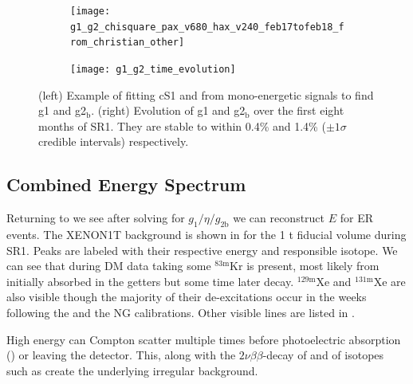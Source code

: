 \begin{figure}
    \begin{subfigure}[t]{0.4\textwidth}
        \texttt{[image: g1\_g2\_chisquare\_pax\_v680\_hax\_v240\_feb17tofeb18\_from\_christian\_other]}
    \end{subfigure}%
    \begin{subfigure}[t]{0.65\textwidth}
        \texttt{[image: g1\_g2\_time\_evolution]}
    \end{subfigure}
    \caption{(left) Example of fitting cS1 and \cstwob from mono-energetic signals to find g1 and g2$_{\mathrm{b}}$.  (right) Evolution
    of g1 and g2$_{\mathrm{b}}$ over the first eight months of SR1.  They are stable to within 0.4\% and 1.4\% ($\pm 1 \sigma$ credible
    intervals) respectively.}
	\label{fig:calibrations_photon_charge_efficiences_g1_g2}
\end{figure}



\subsection{Combined Energy Spectrum}
\label{subsec:det_char_ces}
Returning to  we see after solving for $g_1/\eta/g_{2 \mathrm{b}}$ we can reconstruct $E$ for ER
events.  The XENON1T
background is shown in  for the 1 t fiducial volume during SR1.  Peaks are
labeled with their respective energy and responsible isotope.  We can see that during DM data taking some $\mathrm{^{83m}Kr}$ is present,
most
likely from  initially absorbed in the getters but some time later decay.  $\mathrm{^{129m}Xe}$ and $\mathrm{^{131m}Xe}$ are
also visible though the majority of their de-excitations occur in the weeks following the \ambe and the NG calibrations.  Other
visible lines are listed in .

High energy \gammarays can Compton scatter multiple times before photoelectric absorption () or leaving the
detector.  This, along with the $2 \nu \beta \beta$-decay of  and \betadecays of isotopes such as  create the
underlying irregular background.

